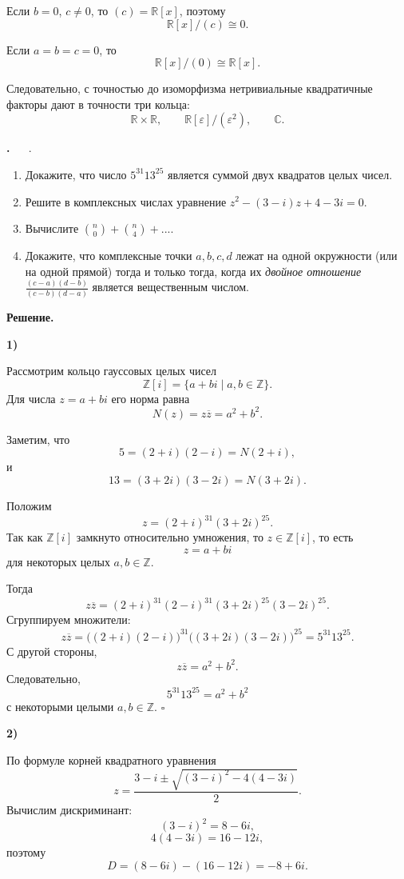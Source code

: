 \documentclass[12pt,a4paper]{article}
\newcounter{task}                   %
\newenvironment{task}[1][]{%
  \refstepcounter{task}%
  \par\vspace{0.3\baselineskip}%
  \noindent\textbf{\thetask.}%
  \if\relax\detokenize{#1}\relax   %
    \ \ignorespaces                 %
  \else
    \ \textbf{#1}.\ \ignorespaces   %
  \fi
}{%
  \par\vspace{0.2\baselineskip}%
}
\newcommand{\sol}{%
  \par\vspace{0.3\baselineskip}%
  \noindent\textbf{Решение.}\ %
  \ignorespaces                     %
}
\newcommand{\soli}[1]{%
  \par\vspace{0.15\baselineskip}%
  \noindent\textbf{#1)}\ %
  \ignorespaces                     %
}
\begin{document}
Если $b=0$, $c\neq 0$, то $(c)=\mathbb R[x]$, поэтому
\[
\mathbb R[x]/(c)\cong 0.
\]

Если $a=b=c=0$, то
\[
\mathbb R[x]/(0)\cong\mathbb R[x].
\]

Следовательно, с точностью до изоморфизма нетривиальные квадратичные факторы дают в точности три кольца:
\[
\boxed{
\mathbb R\times\mathbb R,
\qquad
\mathbb R[\varepsilon]/(\varepsilon^2),
\qquad
\mathbb C.
}
\]


\begin{task}
    \begin{enumerate}
	\item Докажите, что число $5^{31}13^{25}$ является суммой двух квадратов целых чисел.
	\item Решите в комплексных числах уравнение $z^2 - (3- i)z + 4 - 3i = 0$.
	\item Вычислите $\binom{n}{0} + \binom{n}{4} + ... $.
	\item Докажите, что комплексные точки $a, b, c, d$ лежат на одной окружности (или на одной прямой) тогда и только тогда, когда их \textit{двойное отношение} $\frac{(c-a)(d-b)}{(c-b)(d-a)}$ является вещественным числом.
    \end{enumerate}
\end{task}

\sol
\soli{1}
Рассмотрим кольцо гауссовых целых чисел
\[
\mathbb Z[i]=\{a+bi\mid a,b\in\mathbb Z\}.
\]
Для числа $z=a+bi$ его норма равна
\[
N(z)=z\overline z=a^2+b^2.
\]

Заметим, что
\[
5=(2+i)(2-i)=N(2+i),
\]
и
\[
13=(3+2i)(3-2i)=N(3+2i).
\]

Положим
\[
z=(2+i)^{31}(3+2i)^{25}.
\]
Так как $\mathbb Z[i]$ замкнуто относительно умножения, то $z\in\mathbb Z[i]$, то есть
\[
z=a+bi
\]
для некоторых целых $a,b\in\mathbb Z$.

Тогда
\[
z\overline z
=
(2+i)^{31}(2-i)^{31}
(3+2i)^{25}(3-2i)^{25}.
\]
Сгруппируем множители:
\[
z\overline z
=
\bigl((2+i)(2-i)\bigr)^{31}
\bigl((3+2i)(3-2i)\bigr)^{25}
=
5^{31}13^{25}.
\]
С другой стороны,
\[
z\overline z=a^2+b^2.
\]
Следовательно,
\[
5^{31}13^{25}=a^2+b^2
\]
с некоторыми целыми $a,b\in\mathbb Z$. \hfill $\square$

\soli{2}

По формуле корней квадратного уравнения
\[
z=\frac{3-i\pm \sqrt{(3-i)^2-4(4-3i)}}{2}.
\]
Вычислим дискриминант:
\[
(3-i)^2=8-6i,
\]
\[
4(4-3i)=16-12i,
\]
поэтому
\[
D=(8-6i)-(16-12i)=-8+6i.
\]
\end{document}
